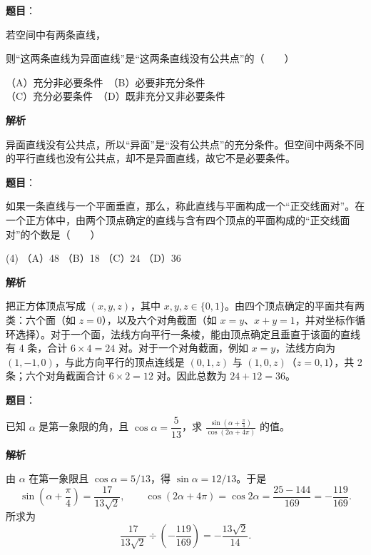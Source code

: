 \begin{answer}

\textbf{题目}：

若空间中有两条直线，

则“这两条直线为异面直线”是“这两条直线没有公共点”的\mbox{（　　）}

（A）充分非必要条件　（B）必要非充分条件\\
（C）充分必要条件　（D）既非充分又非必要条件

\textbf{解析}

异面直线没有公共点，所以“异面”是“没有公共点”的充分条件。但空间中两条不同的平行直线也没有公共点，却不是异面直线，故它不是必要条件。


\end{answer}
\begin{answer}

\textbf{题目}：

如果一条直线与一个平面垂直，那么，称此直线与平面构成一个“正交线面对”。在一个正方体中，由两个顶点确定的直线与含有四个顶点的平面构成的“正交线面对”的个数是\mbox{（　　）}

\begin{gkopts}(4)
\task （A）48
\task （B）18
\task （C）24
\task （D）36
\end{gkopts}

\textbf{解析}

把正方体顶点写成 $(x,y,z)$，其中 $x,y,z\in\{0,1\}$。由四个顶点确定的平面共有两类：六个面（如 $z=0$），以及六个对角截面（如 $x=y$、$x+y=1$，并对坐标作循环选择）。对于一个面，法线方向平行一条棱，能由顶点确定且垂直于该面的直线有 4 条，合计 $6\times4=24$ 对。对于一个对角截面，例如 $x=y$，法线方向为 $(1,-1,0)$，与此方向平行的顶点连线是 $(0,1,z)$ 与 $(1,0,z)$（$z=0,1$），共 2 条；六个对角截面合计 $6\times2=12$ 对。因此总数为 $24+12=36$。


\end{answer}
\begin{answer}

\textbf{题目}：

已知 $\alpha$ 是第一象限的角，且 $\cos\alpha=\dfrac5{13}$，求 $\displaystyle\frac{\sin\left(\alpha+\frac\pi4\right)}{\cos(2\alpha+4\pi)}$ 的值。

\textbf{解析}

由 $\alpha$ 在第一象限且 $\cos\alpha=5/13$，得 $\sin\alpha=12/13$。于是
\nopagebreak[4]
\[
\sin\left(\alpha+\frac\pi4\right)=\frac{17}{13\sqrt2},\qquad
\cos(2\alpha+4\pi)=\cos2\alpha=\frac{25-144}{169}=-\frac{119}{169}.
\]
所求为
\nopagebreak[4]
\[
\frac{17}{13\sqrt2}\div\left(-\frac{119}{169}\right)
=-\frac{13\sqrt2}{14}.
\]


\end{answer}
